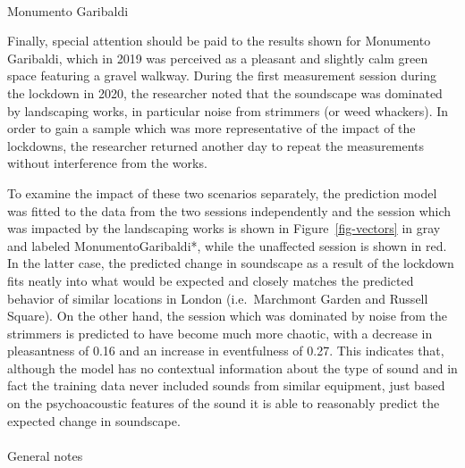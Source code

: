 \documentclass[
  authoryear,
  preprint,
  3p,
  onecolumn]{elsarticle}
\makeatletter
\let\oldparagraph\paragraph
\renewcommand{\paragraph}{
    \@ifstar
      \xxxParagraphStar
      \xxxParagraphNoStar
  }
\newcommand{\xxxParagraphStar}[1]{\oldparagraph*{#1}\mbox{}}
\newcommand{\xxxParagraphNoStar}[1]{\oldparagraph{#1}\mbox{}}
\makeatother
\begin{document}
\paragraph{Monumento Garibaldi}\label{monumento-garibaldi}

Finally, special attention should be paid to the results shown for
Monumento Garibaldi, which in 2019 was perceived as a pleasant and
slightly calm green space featuring a gravel walkway. During the first
measurement session during the lockdown in 2020, the researcher noted
that the soundscape was dominated by landscaping works, in particular
noise from strimmers (or weed whackers). In order to gain a sample which
was more representative of the impact of the lockdowns, the researcher
returned another day to repeat the measurements without interference
from the works.

To examine the impact of these two scenarios separately, the prediction
model was fitted to the data from the two sessions independently and the
session which was impacted by the landscaping works is shown in
Figure~\ref{fig-vectors} in gray and labeled MonumentoGaribaldi*, while
the unaffected session is shown in red. In the latter case, the
predicted change in soundscape as a result of the lockdown fits neatly
into what would be expected and closely matches the predicted behavior
of similar locations in London (i.e.~Marchmont Garden and Russell
Square). On the other hand, the session which was dominated by noise
from the strimmers is predicted to have become much more chaotic, with a
decrease in pleasantness of 0.16 and an increase in eventfulness of
0.27. This indicates that, although the model has no contextual
information about the type of sound and in fact the training data never
included sounds from similar equipment, just based on the psychoacoustic
features of the sound it is able to reasonably predict the expected
change in soundscape.

\paragraph{General notes}\label{general-notes}
\end{document}
